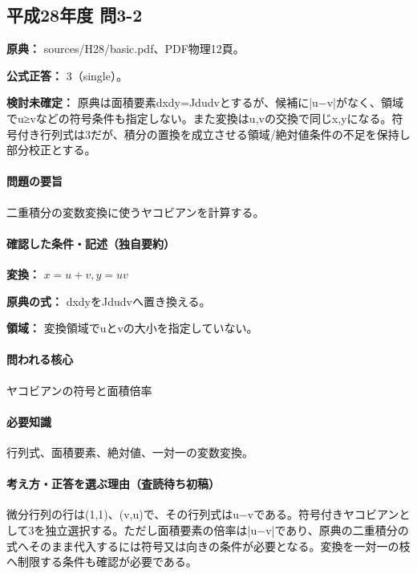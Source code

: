 \subsection{平成28年度 問3-2}
\label{q:h28-reg-basic-3-2}

\noindent\textbf{原典：} sources/H28/basic.pdf、PDF物理12頁。

\textbf{公式正答：} 3（single）。

\par\textbf{検討未確定：} 原典は面積要素dxdy=\allowbreak{}Jdudvとするが、候補に|u−v|がなく、領域でu≥vなどの符号条件も指定しない。また変換はu,vの交換で同じx,yになる。符号付き行列式は3だが、積分の置換を成立させる領域/絶対値条件の不足を保持し部分校正とする。

\paragraph{問題の要旨} 二重積分の変数変換に使うヤコビアンを計算する。

\paragraph{確認した条件・記述（独自要約）}\mbox{}\par

\noindent\textbf{変換：} \(x=u+v,y=uv\)\par

\noindent\textbf{原典の式：} dxdyをJdudvへ置き換える。\par

\noindent\textbf{領域：} 変換領域でuとvの大小を指定していない。\par

\paragraph{問われる核心} ヤコビアンの符号と面積倍率

\paragraph{必要知識} 行列式、面積要素、絶対値、一対一の変数変換。

\paragraph{考え方・正答を選ぶ理由（査読待ち初稿）} 微分行列の行は(1,1)、(v,u)で、その行列式はu−vである。符号付きヤコビアンとして3を独立選択する。ただし面積要素の倍率は|u−v|であり、原典の二重積分の式へそのまま代入するには符号又は向きの条件が必要となる。変換を一対一の枝へ制限する条件も確認が必要である。

